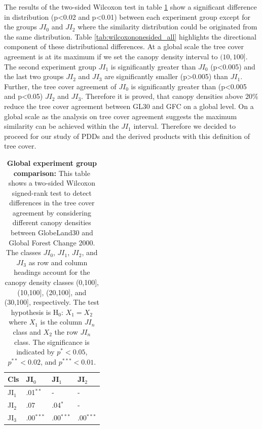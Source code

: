 			The results of the two-sided Wilcoxon test in table \ref{tab:wilcoxontwosided_all} show a significant difference in distribution (p<0.02 and p<0.01) between each experiment group except for the groups $JI_0$ and $JI_2$ where the similarity distribution could be originated from the same distribution. Table \ref{tab:wilcoxononesided_all} highlights the directional component of these distributional differences. At a global scale the tree cover agreement is at its maximum if we set the canopy density interval to $(10,100]$. The second experiment group $JI_1$ is significantly greater than $JI_0$ (p<0.005) and the last two groups $JI_2$ and $JI_3$ are significantly smaller (p>0.005) than $JI_1$. Further, the tree cover agreement of $JI_0$ is significantly greater than (p<0.005 and p<0.05) $JI_2$ and $JI_3$. Therefore it is proved, that canopy densities above 20\% reduce the tree cover agreement between \ac{GL30} and \ac{GFC} on a global level. On a global scale as the analysis on tree cover agreement suggests the maximum similarity can be achieved within the $JI_1$ interval. Therefore we decided to proceed for our study of \acp{PDD} and the derived products with this definition of tree cover.
			\begin{table}[ht]
				\centering
				\caption[Global experiment group comparison]{\textbf{Global experiment group comparison:} This table shows a two-sided Wilcoxon signed-rank test to detect differences in the tree cover agreement by considering different canopy densities between GlobeLand30 and Global Forest Change 2000. The classes $JI_0$, $JI_1$, $JI_2$, and $JI_3$ as row and column headings account for the canopy density classes (0,100], (10,100], (20,100], and (30,100], respectively. The test hypothesis is H$_0$: $X_1=X_2$ where $X_1$ is the column $JI_n$ class and $X_2$ the row $JI_n$ class. The significance is indicated by $p^{*}<0.05$, $p^{**}<0.02$, and $p^{***}<0.01$.}
				\label{tab:wilcoxontwosided_all}
				\begin{tabular}{llll}
					\hline
					Cls & JI$_0$ & JI$_1$ & JI$_2$ \\\hline
					JI$_1$ & .01$^{**}$ & - & - \\
					JI$_2$ & .07 & .04$^{*}$ & - \\
					JI$_3$ & .00$^{***}$ & .00$^{***}$ & .00$^{***}$ \\\hline
				\end{tabular}
			\end{table}

